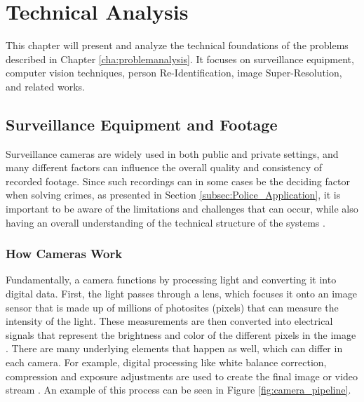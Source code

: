 \chapter{Technical Analysis} \label{cha: technicalanalysis}
This chapter will present and analyze the technical foundations of the problems described in Chapter \ref{cha:problemanalysis}. It focuses on surveillance equipment, computer vision techniques, person Re-Identification, image Super-Resolution, and related works.   

\section{Surveillance Equipment and Footage}
\label{subsec:Surveillance_equipment_n_footage}

Surveillance cameras are widely used in both public and private settings, and many different factors can influence the overall quality and consistency of recorded footage. Since such recordings can in some cases be the deciding factor when solving crimes, as presented in Section \ref{subsec:Police_Application}, it is important to be aware of the limitations and challenges that can occur, while also having an overall understanding of the technical structure of the systems \cite{arxiv_superres2021}.
 
\subsection{How Cameras Work}
\label{subsubsec:How_cameras_work}
Fundamentally, a camera functions by processing light and converting it into digital data. First, the light passes through a lens, which focuses it onto an image sensor that is made up of millions of photosites (pixels) that can measure the intensity of the light. These measurements are then converted into electrical signals that represent the brightness and color of the different pixels in the image \cite{unc_camera_pipeline}.
There are many underlying elements that happen as well, which can differ in each camera. For example, digital processing like white balance correction, compression and exposure adjustments are used to create the final image or video stream \cite{unc_camera_pipeline}.
An example of this process can be seen in Figure \ref{fig:camera_pipeline}.

